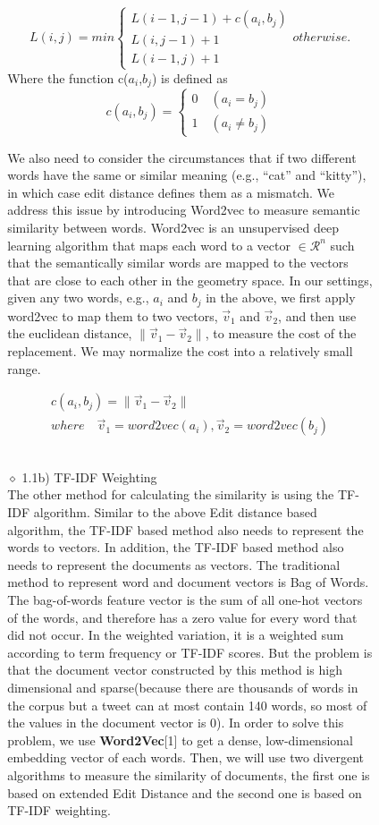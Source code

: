 \documentclass[10pt]{article}
\begin{document}
\begin{itemize}
\begin{itemize}
\begin{itemize}
\begin{itemize}
$$
L(i, j) = min
\left\{
\begin{array}{ll}
L(i-1, j-1) + c(a_i,b_j) \\
L(i, j-1) +1 \\
L(i-1, j) +1
\end{array}
\right.
otherwise.
$$
Where the function c($a_i$,$b_j$) is defined as
$$
c(a_i, b_j)=
\left\{
\begin{array}{ll}
0 \quad (a_i = b_j) \\
1 \quad (a_i \neq b_j)
\end{array}
\right.
$$

We also need to consider the circumstances that if two different words have the same or similar meaning (e.g., “cat” and “kitty”), in which case edit distance defines them as a mismatch. We address this issue by introducing Word2vec to measure semantic similarity between words. 
 Word2vec is an unsupervised  deep learning algorithm that maps each word to a vector  $\in \mathcal{R}^n$ such that the semantically similar words are mapped to the vectors that are close to each other in the geometry space. 
In our settings, given any two words, e.g.,  $a_i$ and $b_j$ in the above, we first apply word2vec to map them to two vectors, $\vec{v}_1$ and $\vec{v}_2$, and then use the euclidean distance, $\lVert \vec{v}_1 - \vec{v}_2 \rVert$, to measure the cost of the replacement.
We may normalize the cost into a relatively small range. 

$$
\begin{array}{c}
c(a_i, b_j)=\lVert \vec{v}_1 - \vec{v}_2 \rVert \\
where \quad  \vec{v}_1 = word2vec(a_i), \vec{v}_2=word2vec(b_j)
\end{array}
$$
\\
\item[$\diamond$]{1.1b) TF-IDF Weighting}\\
The other method for calculating the similarity is using the TF-IDF algorithm. 
Similar to the above Edit distance based algorithm,  the TF-IDF based method also needs to represent the words  to vectors. In addition, the TF-IDF based method also needs to represent the documents as vectors. The traditional method to represent word and document vectors is Bag of Words. The bag-of-words feature vector is the sum of all one-hot vectors of the words, and therefore has a zero value for every word that  did not occur. In the weighted variation, it is a weighted sum according to term frequency or TF-IDF scores. But the problem is that the document vector constructed by this method is high dimensional and sparse(because there are thousands of words in the corpus but a tweet can at most contain 140 words, so most of the values in the document vector is 0). In order to solve this problem, we use  {\bf Word2Vec}[1] to get a dense, low-dimensional embedding vector of each words. Then, we will use two divergent algorithms to measure the similarity of documents, the first one is based on extended  Edit Distance and the second one is based on TF-IDF weighting.\\\\



\end{itemize}
\end{itemize}
\end{itemize}
\end{itemize}
\end{document}
